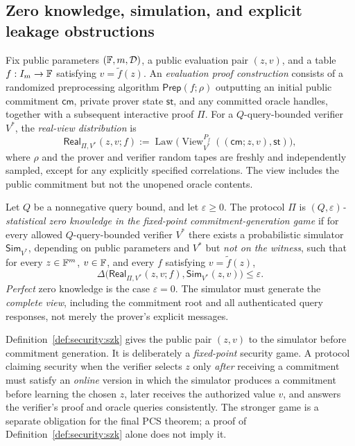 \subsection{Zero knowledge, simulation, and explicit leakage obstructions}\label{sec:security:zk}

\begin{definition}\label{def:security:real}
Fix public parameters $(\mathbb{F},m,\mathcal D)$, a public evaluation pair $(z,v)$, and a table $f:I_m\to\mathbb{F}$ satisfying $v=\widetilde f(z)$. An \emph{evaluation proof construction} consists of a randomized preprocessing algorithm $\mathsf{Prep}(f;\rho)$ outputting an initial public commitment $\mathsf{cm}$, private prover state $\mathsf{st}$, and any committed oracle handles, together with a subsequent interactive proof $\Pi$.
For a $Q$-query-bounded verifier $V^*$, the \emph{real-view distribution} is
\[
 \mathsf{Real}_{\Pi,V^*}(z,v;f)
 :=\operatorname{Law}\bigl(
   \operatorname{View}_{V^*}^{P_f}((\mathsf{cm};z,v),\mathsf{st})
  \bigr),
\]
where $\rho$ and the prover and verifier random tapes are freshly and independently sampled, except for any explicitly specified correlations. The view includes the public commitment but not the unopened oracle contents.
\end{definition}

\begin{definition}\label{def:security:szk}
Let $Q$ be a nonnegative query bound, and let $\varepsilon\geq0$. The protocol $\Pi$ is \emph{$(Q,\varepsilon)$-statistical zero knowledge in the fixed-point commitment-generation game} if for every allowed $Q$-query-bounded verifier $V^*$ there exists a probabilistic simulator $\mathsf{Sim}_{V^*}$, depending on public parameters and $V^*$ but \emph{not on the witness}, such that for every $z\in\mathbb{F}^m$, $v\in\mathbb{F}$, and every $f$ satisfying $v=\widetilde f(z)$,
\begin{equation}\label{eq:security:zk}
 \Delta\bigl(\mathsf{Real}_{\Pi,V^*}(z,v;f),
             \mathsf{Sim}_{V^*}(z,v)\bigr)\leq\varepsilon.
\end{equation}
\emph{Perfect} zero knowledge is the case $\varepsilon=0$. The simulator must generate the \emph{complete view}, including the commitment root and all authenticated query responses, not merely the prover's explicit messages.
\end{definition}

\begin{remark}\label{rem:security:point-order}
Definition~\ref{def:security:szk} gives the public pair $(z,v)$ to the simulator before commitment generation. It is deliberately a \emph{fixed-point} security game. A protocol claiming security when the verifier selects $z$ only \emph{after} receiving a commitment must satisfy an \emph{online} version in which the simulator produces a commitment before learning the chosen $z$, later receives the authorized value $v$, and answers the verifier's proof and oracle queries consistently. The stronger game is a separate obligation for the final PCS theorem; a proof of Definition~\ref{def:security:szk} alone does not imply it.
\end{remark}


